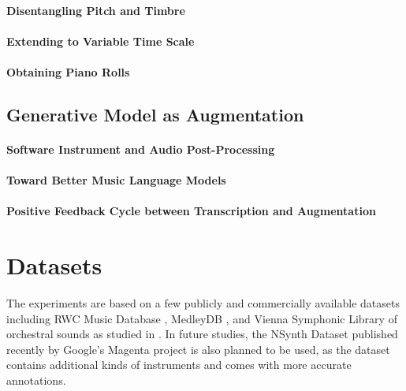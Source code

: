 \paragraph{Disentangling Pitch and Timbre}

\paragraph{Extending to Variable Time Scale}

\paragraph{Obtaining Piano Rolls}

\subsection{Generative Model as Augmentation}

\paragraph{Software Instrument and Audio Post-Processing}

\paragraph{Toward Better Music Language Models}

\paragraph{Positive Feedback Cycle between Transcription and Augmentation}


\section{Datasets}

The experiments are based on a few publicly and commercially available datasets including RWC Music Database \cite{goto2003rwc}, MedleyDB \cite{bittner2014medleydb}, and Vienna Symphonic Library of orchestral sounds as studied in \cite{humphrey2011nlse}.
In future studies, the NSynth Dataset published recently by Google's Magenta project \cite{engel2017nsynth} is also planned to be used, as the dataset contains additional kinds of instruments and comes with more accurate annotations.

